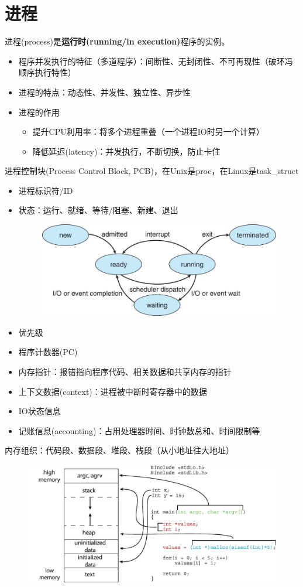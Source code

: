
\section{进程}
进程(process)是\textbf{运行时(running/in execution)}程序的实例。
\begin{itemize}
	\item 程序并发执行的特征（多道程序）：间断性、无封闭性、不可再现性（破环冯顺序执行特性）
	\item 进程的特点：动态性、并发性、独立性、异步性
	\item 进程的作用
	\begin{itemize}
		\item 提升CPU利用率：将多个进程重叠（一个进程IO时另一个计算）
		\item 降低延迟(latency)：并发执行，不断切换，防止卡住
	\end{itemize}
\end{itemize}

进程控制块(Process Control Block, PCB)，在Unix是proc，在Linux是task\_struct
\begin{itemize}
	\item 进程标识符/ID
	\item 状态：运行、就绪、等待/阻塞、新建、退出
	\begin{figure}[H]
	\centering
	\includegraphics[width=0.6\linewidth]{fig/5-state-process-model.jpg}
	\end{figure}
	\item 优先级
	\item 程序计数器(PC)
	\item 内存指针：报错指向程序代码、相关数据和共享内存的指针
	\item 上下文数据(context)：进程被中断时寄存器中的数据
	\item IO状态信息
	\item 记账信息(accounting)：占用处理器时间、时钟数总和、时间限制等
\end{itemize}


内存组织：代码段、数据段、堆段、栈段（从小地址往大地址）
\begin{figure}[H]
\centering
\includegraphics[width=0.8\linewidth]{fig/C_memory.jpg}
\end{figure}

